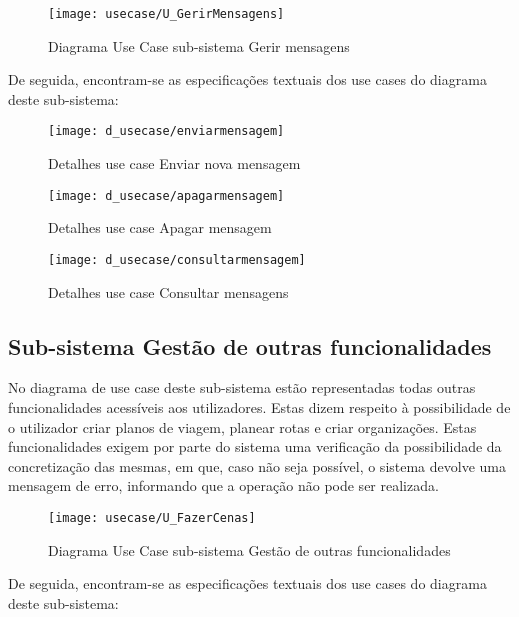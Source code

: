 \documentclass[12pt,a4paper]{article}
\begin{document}
\begin{figure}[h!]
\centering
\texttt{[image: usecase/U\_GerirMensagens]}
\label{usecase}
\caption{Diagrama Use Case sub-sistema Gerir mensagens}
\end{figure}

De seguida, encontram-se as especificações textuais dos use cases do diagrama deste sub-sistema:\\

\begin{figure}[h!]
\centering
\texttt{[image: d\_usecase/enviarmensagem]}
\label{usecase}
\caption{Detalhes use case Enviar nova mensagem}
\end{figure}

\begin{figure}[h!]
\centering
\texttt{[image: d\_usecase/apagarmensagem]}
\label{usecase}
\caption{Detalhes use case Apagar mensagem}
\end{figure}

\begin{figure}[h!]
\centering
\texttt{[image: d\_usecase/consultarmensagem]}
\label{usecase}
\caption{Detalhes use case Consultar mensagens}
\end{figure}

\clearpage
\newpage

\subsection{Sub-sistema Gestão de outras funcionalidades}
No diagrama de use case deste sub-sistema estão representadas todas outras funcionalidades acessíveis aos utilizadores. Estas dizem respeito à possibilidade de o utilizador criar planos de viagem, planear rotas e criar organizações. Estas funcionalidades exigem por parte do sistema uma verificação da possibilidade da concretização das mesmas, em que, caso não seja possível, o sistema devolve uma mensagem de erro, informando que a operação não pode ser realizada.\\

\begin{figure}[h!]
\centering
\texttt{[image: usecase/U\_FazerCenas]}
\label{usecase}
\caption{Diagrama Use Case sub-sistema Gestão de outras funcionalidades}
\end{figure}

De seguida, encontram-se as especificações textuais dos use cases do diagrama deste sub-sistema:\\
\end{document}
